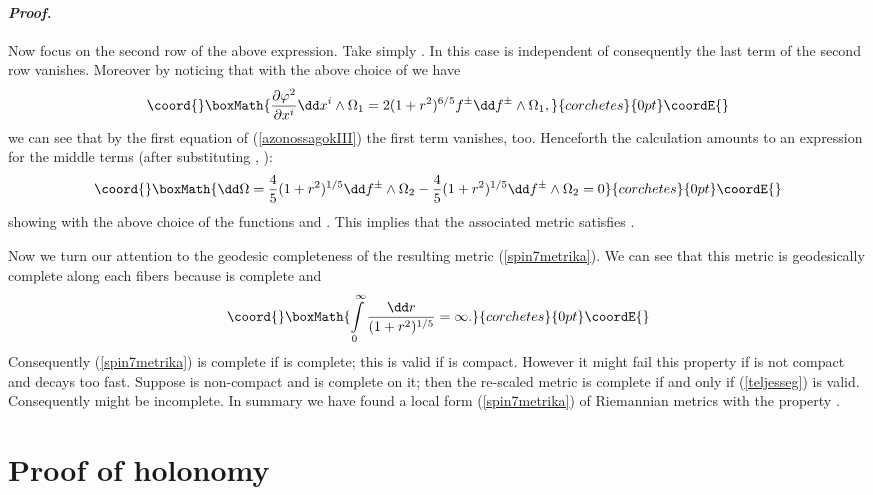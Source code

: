 \documentclass[a4paper,12pt,draft]{article}
\newenvironment{proof}{\paragraph{\it Proof.}}{\myHighlight{$\square$}\coordHE{}\vskip0.4cm}
\begin{document}
\begin{proof}
Now focus on the second row of the above expression. Take simply
\coordHE{}. In this case \myHighlight{$\psi$}\coordHE{} is independent of \coordHE{} consequently the
last term of the second row vanishes. Moreover by noticing that with the
above choice of \coordHE{} we have
\[\coord{}\boxMath{{\partial\varphi^2\over\partial x^i}\dd
x^i\wedge\Omega_1=2(1+r^2)^{6/5}f^\pm\dd f^\pm\wedge\Omega_1,}{corchetes}{0pt}\coordE{}\]
we can see that by the first equation of
(\ref{azonossagokIII}) the first term vanishes, too. Henceforth the
calculation amounts to an expression for
the middle terms (after substituting \myHighlight{$\varphi$}\coordHE{}, \myHighlight{$\psi$}\coordHE{}):
\[\coord{}\boxMath{\dd\Omega ={4\over 5}(1+r^2)^{1/5}\dd f^\pm\wedge\Omega_2-{4\over
5}(1+r^2)^{1/5}\dd f^\pm\wedge\Omega_2 =0}{corchetes}{0pt}\coordE{}\]
showing \coordHE{} with the above choice of the functions \myHighlight{$\varphi$}\coordHE{}
and \myHighlight{$\psi$}\coordHE{}. This implies that the associated metric satisfies \coordHE{}.

Now we turn our attention to the geodesic completeness of the resulting
metric (\ref{spin7metrika}). We can see that this metric is geodesically
complete along each fibers because \coordHE{}
is complete and 
\[\coord{}\boxMath{\int\limits_0^\infty {\dd r\over (1+r^2)^{1/5}}=\infty .}{corchetes}{0pt}\coordE{}\]
Consequently (\ref{spin7metrika}) is complete if
\coordHE{} is complete; this is
valid if \coordHE{} is compact. However it might fail this property if \coordHE{} is not
compact and \coordHE{} decays too fast. Suppose
\coordHE{} is non-compact and \coordHE{} is complete on
it; then the re-scaled metric is complete if and only if
(\ref{teljesseg}) is valid. Consequently \coordHE{} might be 
incomplete.
\end{proof}
In summary we have found a local form (\ref{spin7metrika}) of Riemannian
metrics \coordHE{} with the property \coordHE{}. 

\section{Proof of \coordHE{} holonomy}
\end{document}
